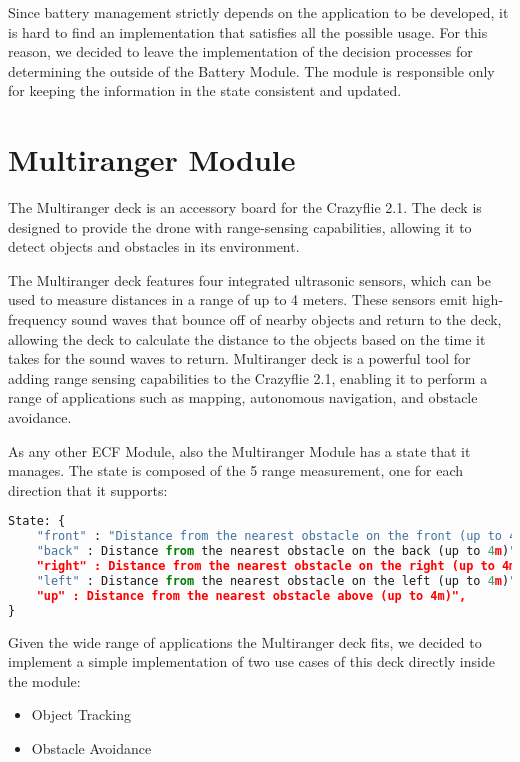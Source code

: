 Since battery management strictly depends on the application to be developed, it is hard to find an implementation that satisfies all the possible usage.
For this reason, we decided to leave the implementation of the decision processes for determining the outside of the Battery Module. 
The module is responsible only for keeping the information in the state consistent and updated.

\section{Multiranger Module}\label{sec:module_multiranger}

The Multiranger deck is an accessory board for the Crazyflie 2.1. 
The deck is designed to provide the drone with range-sensing capabilities, allowing it to detect objects and obstacles in its environment.

The Multiranger deck features four integrated ultrasonic sensors, which can be used to measure distances in a range of up to 4 meters. 
These sensors emit high-frequency sound waves that bounce off of nearby objects and return to the deck, allowing the deck to calculate the distance to the objects based on the time it takes for the sound waves to return.
Multiranger deck is a powerful tool for adding range sensing capabilities to the Crazyflie 2.1, enabling it to perform a range of applications such as mapping, autonomous navigation, and obstacle avoidance.

As any other ECF Module, also the Multiranger Module has a state that it manages. The state is composed of the 5 range measurement, one for each direction that it supports:
\begin{lstlisting}[language=Python]
State: {
    "front" : "Distance from the nearest obstacle on the front (up to 4m)",
    "back" : Distance from the nearest obstacle on the back (up to 4m)",
    "right" : Distance from the nearest obstacle on the right (up to 4m)",
    "left" : Distance from the nearest obstacle on the left (up to 4m)",
    "up" : Distance from the nearest obstacle above (up to 4m)",
}
\end{lstlisting}

Given the wide range of applications the Multiranger deck fits, we decided to implement a simple implementation of two use cases of this deck directly inside the module:
\begin{itemize}
    \item Object Tracking 
    \item Obstacle Avoidance
\end{itemize}


